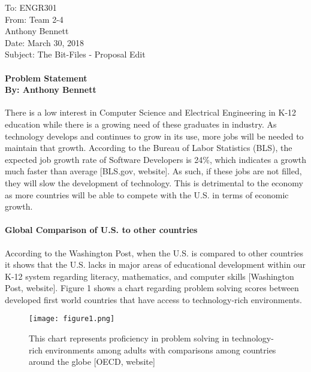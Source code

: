 \documentclass[12pt, letterpaper]{report}
\begin{document}
\thispagestyle{empty}

To: ENGR301\\
From: Team 2-4\\
\-\hspace{1.075cm} Anthony Bennett\\ 
Date: March 30, 2018\\
Subject: The Bit-Files - Proposal Edit

\paragraph*{\fontsize{14pt}{12pt}\selectfont Problem Statement \\  \fontsize{10pt}{12pt}\selectfont By: Anthony Bennett \\}
There is a low interest in Computer Science and Electrical Engineering in K-12 education while there is a growing need of these graduates in industry. As technology develops and continues to grow in its use, more jobs will be needed to maintain that growth. According to the Bureau of Labor Statistics (BLS), the expected job growth rate of Software Developers is 24\%, which indicates a growth much faster than average [BLS.gov, website]. As such, if these jobs are not filled, they will slow the development of technology. This is detrimental to the economy as more countries will be able to compete with the U.S. in terms of economic growth. 

\paragraph*{Global Comparison of U.S. to other countries \\ }
According to the Washington Post, when the U.S. is compared to other countries it shows that the U.S. lacks in major areas of educational development within our K-12 system regarding literacy, mathematics, and computer skills [Washington Post, website]. Figure 1 shows a chart regarding problem solving scores between developed first world countries that have access to technology-rich environments. 

\begin{figure}[H]
    \centering
    \texttt{[image: figure1.png]}
    \captionsetup{justification=centering}
    \caption{This chart represents proficiency in problem solving in technology-rich environments among adults with comparisons among countries around the globe [OECD, website]}
\end{figure}
\end{document}
